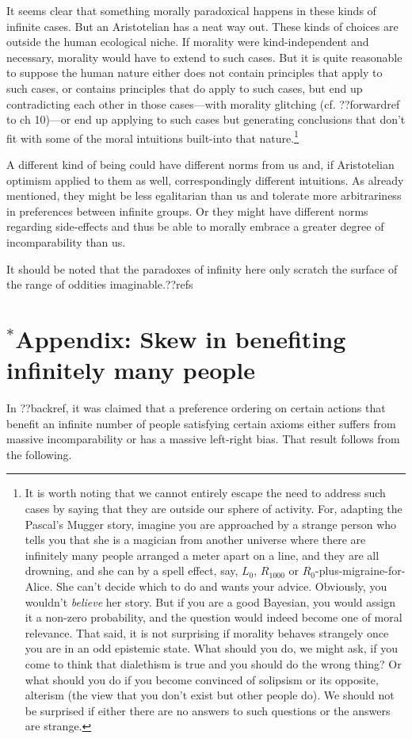 It seems clear that something morally paradoxical happens in these kinds of infinite cases. But an 
Aristotelian has a neat way out. These kinds of choices are outside the human ecological niche. If 
morality were kind-independent and necessary, morality would have to extend to such cases. But 
it is quite reasonable to suppose the human nature either does not contain principles that apply to 
such cases, or contains principles that do apply to such cases, but end up contradicting each other 
in those cases---with morality glitching (cf. ??forwardref to ch 10)---or end up applying to such 
cases but generating conclusions that don't fit with some of the moral intuitions built-into that 
nature.\footnote{It is worth noting that we cannot entirely escape the need to address such cases
by saying that they are outside our sphere of activity. For, adapting the Pascal's Mugger story, 
imagine you are approached by a strange person who tells you that she is a magician from another
universe where there are infinitely many people arranged a meter apart on a line, and they are all
drowning, and she can by a spell effect, say, $L_0$, $R_{1000}$ or $R_{0}$-plus-migraine-for-Alice. 
She can't decide which to do and wants your advice. Obviously, you wouldn't \textit{believe} her story. But if you are a good Bayesian,
you would assign it a non-zero probability, and the question would indeed become one of moral 
relevance. That said, it is not surprising if morality behaves strangely once you are in an odd 
epistemic state. What should you do, we might ask, if you come to think that dialethism is true and 
you should do the wrong thing? Or what should you do if you become convinced of solipsism or its 
opposite, alterism (the view that you don't exist but other people do). We should not be surprised if 
either there are no answers to such questions or the answers are strange.}

A different kind of being could have different norms from us and, if Aristotelian optimism applied 
to them as well, correspondingly different intuitions. As already mentioned, they might be less 
egalitarian than us and tolerate more arbitrariness in preferences between infinite groups. Or they
might have different norms regarding side-effects and thus be able to morally embrace a greater
degree of incomparability than us. 

It should be noted that the paradoxes of infinity here only scratch the surface of the range of 
oddities imaginable.??refs


\section*{$^*$Appendix: Skew in benefiting infinitely many people} 
In ??backref, it was claimed that a preference ordering on certain actions 
that benefit an infinite number of people satisfying certain axioms either
suffers from massive incomparability or has a massive left-right bias.
That result follows from the following.

